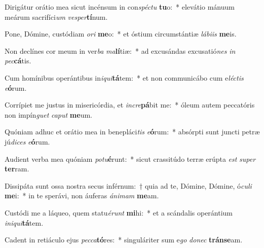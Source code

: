 \item Dirigátur orátio mea sicut incénsum in con\textit{spéc}\textit{tu} \textbf{tu}o:~* elevátio mánuum meárum sacrifíci\textit{um} \textit{ves}\textit{per}\textbf{tí}num.
\item Pone, Dómine, custódiam \textit{o}\textit{ri} \textbf{me}o:~* et óstium circumstántiæ \textit{lá}\textit{bi}\textit{is} \textbf{me}is.
\item Non declínes cor meum in ver\textit{ba} \textit{ma}\textbf{lí}tiæ:~* ad excusándas excusatió\textit{nes} \textit{in} \textit{pec}\textbf{cá}tis.
\item Cum homínibus operántibus in\textit{i}\textit{qui}\textbf{tá}tem:~* et non communicábo cum e\textit{léc}\textit{tis} \textit{e}\textbf{ó}rum.
\item Corrípiet me justus in misericórdia, et \textit{in}\textit{cre}\textbf{pá}bit me:~* óleum autem peccatóris non impín\textit{guet} \textit{ca}\textit{put} \textbf{me}um.
\item Quóniam adhuc et orátio mea in benepláci\textit{tis} \textit{e}\textbf{ó}rum:~* absórpti sunt juncti petræ jú\textit{di}\textit{ces} \textit{e}\textbf{ó}rum.
\item Audient verba mea quóniam \textit{pot}\textit{u}\textbf{é}runt:~* sicut crassitúdo terræ erúpta \textit{est} \textit{su}\textit{per} \textbf{ter}ram.
\item Dissipáta sunt ossa nostra secus inférnum:~† quia ad te, Dómine, Dómine, ó\textit{cu}\textit{li} \textbf{me}i:~* in te sperávi, non áuferas \textit{á}\textit{ni}\textit{mam} \textbf{me}am.
\item Custódi me a láqueo, quem statu\textit{é}\textit{runt} \textbf{mi}hi:~* et a scándalis operántium \textit{in}\textit{i}\textit{qui}\textbf{tá}tem.
\item Cadent in retiáculo ejus \textit{pec}\textit{ca}\textbf{tó}res:~* singuláriter sum e\textit{go} \textit{do}\textit{nec} \textbf{tráns}\textbf{e}am.
